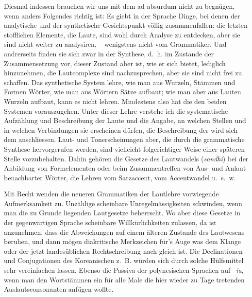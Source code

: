 Diesmal indessen brauchen wir uns mit dem  ad absurdum nicht zu begnügen, wenn anders Folgendes richtig ist: Es giebt in der Sprache Dinge, bei denen der analytische und der synthetische Gesichtspunkt völlig zusammenfallen: die letzten stofflichen Elemente, die Laute, sind wohl durch Analyse zu entdecken, aber sie sind nicht weiter zu analysiren, – wenigstens nicht vom Grammatiker. Und andrerseits finden sie sich zwar in der Synthese, d.~h. im Zustande der Zusammensetzung vor, dieser Zustand aber ist, wie er sich bietet, lediglich hinzunehmen, die Lautcomplexe sind nachzusprechen, aber sie sind nicht frei \label{fp.89} zu schaffen. Das synthetische System lehre, wie man aus Wurzeln, Stämmen und Formen Wörter, wie man aus Wörtern Sätze aufbaut; wie man aber aus Lauten Wurzeln aufbaut, kann es nicht lehren. Mindestens also hat die  den beiden Systemen vorauszugehen. Unter dieser Lehre verstehe ich die systematische Aufzählung und Beschreibung der Laute und die Angabe, an welchen Stellen und in welchen Verbindungen sie erscheinen dürfen, die Beschreibung der  wird sich dem anschliessen. Laut- und Tonerscheinungen aber, die durch die grammatische Synthese hervorgerufen werden, sind vielleicht folgerichtiger Weise einer späteren Stelle vorzubehalten. Dahin gehören die Gesetze des Lautwandels (\textit{sandhi}) bei der Anbildung von Formelementen oder beim Zusammentreffen von Aus- und Anlaut benachbarter Wörter, die Lehren vom Satzaccent, vom Accentwandel u.~s.~w.

Mit Recht wenden die neueren Grammatiken der Lautlehre vorwiegende Aufmerksamkeit zu. Unzählige scheinbare Unregelmässigkeiten schwinden, wenn man die zu Grunde liegenden Lautgesetze beherrscht. Wo aber diese Gesetze in der gegenwärtigen Sprache scheinbare Willkürlichkeiten zulassen, da ist anzunehmen, dass die Abweichungen auf einem älteren Zustande des Lautwesens beruhen, und dann mögen diakritische Merkzeichen für’s Auge  was dem Klange oder der jetzt landesüblichen Rechtschreibung nach gleich ist. Die Declinationen und Conjugationen des Koreanischen z.~B. würden sich durch solche Hülfsmittel sehr vereinfachen lassen. Ebenso die Passiva der polynesischen Sprachen auf \textit{–ia}, wenn man den Wortstämmen ein für alle Male die  hier wieder zu Tage tretenden Auslautsconsonanten anfügen wollte.

